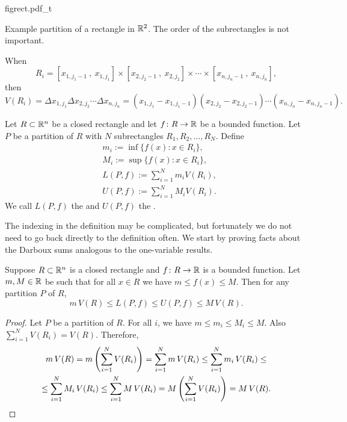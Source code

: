 \begin{defn}
\begin{myfigureht}
{figrect.pdf_t}
\caption{Example partition of a rectangle in ${\mathbb{R}}^2$.  The order of the
subrectangles is not important.\label{mv:figrect}}
\end{myfigureht}

When
\begin{equation*}
R_i = [x_{1,j_1-1}~,~ x_{1,j_1}]
\times
[x_{2,j_2-1}~,~ x_{2,j_2}]
\times
\cdots
\times
[x_{n,j_n-1}~,~ x_{n,j_n}] ,
\end{equation*}
then
\begin{equation*}
V(R_i) = 
\Delta x_{1,j_1}
\Delta x_{2,j_2}
\cdots
\Delta x_{n,j_n}
=
(x_{1,j_1}-x_{1,j_1-1})
(x_{2,j_2}-x_{2,j_2-1})
\cdots
(x_{n,j_n}-x_{n,j_n-1}) .
\end{equation*}

Let $R \subset {\mathbb{R}}^n$ be a closed rectangle and
let $f \colon R \to {\mathbb{R}}$ be a bounded function.  Let $P$ be a partition of
$R$ with $N$ subrectangles $R_1,R_2,\ldots,R_N$.
Define
\begin{align*}
& m_i := \inf \bigl\{ f(x) : x \in R_i \bigr\} , \\
& M_i := \sup \bigl\{ f(x) : x \in R_i \bigr\} , \\
& L(P,f) :=
\sum_{i=1}^N m_i V(R_i) , \\
& U(P,f) :=
\sum_{i=1}^N M_i V(R_i) .
\end{align*}
We call $L(P,f)$ the \emph{} and
$U(P,f)$ the \emph{}.
\end{defn}

The indexing in the definition may be complicated, but fortunately we
do not need to go back directly to the definition often.
We start by proving facts about the Darboux sums analogous to the one-variable
results.

\begin{prop} \label{mv:sumulbound:prop}
Suppose $R \subset {\mathbb{R}}^n$ is a closed rectangle
and $f \colon R \to {\mathbb{R}}$ is a bounded function.  Let $m, M \in {\mathbb{R}}$ be 
such that for all $x \in R$ we have $m \leq f(x) \leq M$.  Then for any partition
$P$ of $R$,
\begin{equation*}
m \, V(R) \leq
L(P,f) \leq U(P,f)
\leq M\, V(R) .
\end{equation*}
\end{prop}

\begin{proof}
Let $P$ be a partition of $R$.  For all $i$, we have
$m \leq m_i \leq M_i \leq M$.  Also $\sum_{i=1}^N V(R_i) = V(R)$.  Therefore,
\begin{multline*}
m \, V(R) =
m \left( \sum_{i=1}^N V(R_i) \right)
=
\sum_{i=1}^N m \, V(R_i)
\leq
\sum_{i=1}^N m_i \, V(R_i)
\leq
\\
\leq
\sum_{i=1}^N M_i \, V(R_i)
\leq
\sum_{i=1}^N M \,V(R_i)
=
M \left( \sum_{i=1}^N V(R_i) \right)
=
M \,V(R) .  \qedhere
\end{multline*}
\end{proof}

